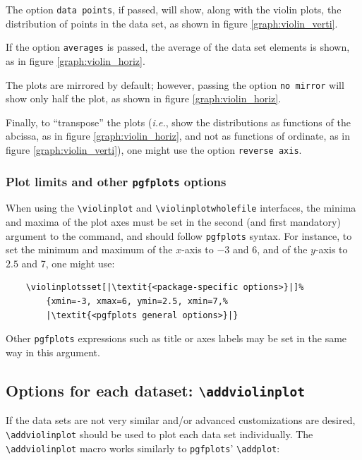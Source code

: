 \documentclass{article}
\begin{document}
The option \texttt{data points}, if passed, will show, along with
the violin plots, the distribution of points in the data set, as shown in
figure \ref{graph:violin_verti}.

If the option \texttt{averages} is passed, the average of the data set
elements is shown, as in figure \ref{graph:violin_horiz}.

The plots are mirrored by default; however, passing the option \texttt{no mirror}
will show only half the plot, as shown in figure \ref{graph:violin_horiz}.

Finally, to ``transpose'' the plots (\textit{i.e.}, show the distributions
as functions of the abcissa, as in figure \ref{graph:violin_horiz},
and not as functions of ordinate, as in figure \ref{graph:violin_verti}),
one might use the option \texttt{reverse axis}.

\subsubsection{Plot limits and other \texttt{pgfplots} options}

When using the \texttt{{\textbackslash}violinplot} and
\texttt{{\textbackslash}violinplotwholefile} interfaces,
the minima and maxima of the plot axes must be set in the second (and first
mandatory) argument to the command, and should follow \texttt{pgfplots}
syntax. For instance, to set the minimum and maximum of the $x$-axis
to $-3$ and 6, and of the $y$-axis to $2.5$ and 7, one might use:

\begin{verbatim}
	\violinplotsset[|\textit{<package-specific options>}|]%
		{xmin=-3, xmax=6, ymin=2.5, xmin=7,%
		|\textit{<pgfplots general options>}|}
\end{verbatim}

Other \texttt{pgfplots} expressions such as title or axes labels may be set
in the same way in this argument.

\subsection{Options for each dataset: \texttt{{\textbackslash}addviolinplot}}

If the data sets are not very similar and/or advanced customizations
are desired, \texttt{{\textbackslash}addviolinplot} should be used to
plot each data set individually.
The \texttt{{\textbackslash}addviolinplot} macro works similarly to
\texttt{pgfplots}' \texttt{{\textbackslash}addplot}:
\end{document}
